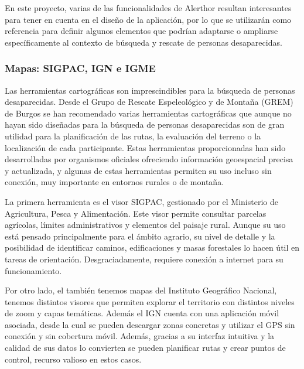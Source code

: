     En este proyecto, varias de las funcionalidades de Alerthor resultan interesantes para tener en cuenta en el diseño de la aplicación, por lo que se utilizarán como referencia para definir algunos elementos que podrían adaptarse o ampliarse específicamente al contexto de búsqueda y rescate de personas desaparecidas.
        
        
    
    \subsubsection{Mapas: SIGPAC, IGN e IGME}


    Las herramientas cartográficas son imprescindibles para la búsqueda de personas desaparecidas. Desde el Grupo de Rescate Espeleológico y de Montaña (GREM) de Burgos\cite{GREM} se han recomendado varias herramientas cartográficas que aunque no hayan sido diseñadas para la búsqueda de personas desaparecidas son de gran utilidad para la planificación de las rutas, la evaluación del terreno o la localización de cada participante. Estas herramientas proporcionadas han sido desarrolladas por organismos oficiales ofreciendo información geoespacial precisa y actualizada, y algunas de estas herramientas permiten su uso incluso sin conexión, muy importante en entornos rurales o de montaña.

    La primera herramienta es el visor SIGPAC\cite{SIGPACVisor}, gestionado por el Ministerio de Agricultura, Pesca y Alimentación. Este visor permite consultar parcelas agrícolas, límites administrativos y elementos del paisaje rural. Aunque su uso está pensado principalmente para el ámbito agrario, su nivel de detalle y la posibilidad de identificar caminos, edificaciones y masas forestales lo hacen útil en tareas de orientación. Desgraciadamente, requiere conexión a internet para su funcionamiento.
    

    Por otro lado, el también tenemos mapas del Instituto Geográfico Nacional\cite{IGNPortal}, tenemos distintos visores que permiten explorar el territorio con distintos niveles de zoom y capas temáticas\cite{IGNVisorIberpix, IGNVisorSignA}. Además el IGN cuenta con una aplicación móvil asociada, desde la cual se pueden descargar zonas concretas y utilizar el GPS sin conexión y sin cobertura móvil. Además, gracias a su interfaz intuitiva y la calidad de sus datos lo convierten se pueden planificar rutas y crear puntos de control, recurso valioso en estos casos.

